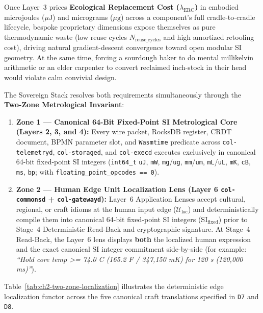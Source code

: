 Once Layer~3 prices \textbf{Ecological Replacement Cost ($\lambda_{\mathrm{ERC}}$)} in
embodied microjoules ($\mu\mathrm{J}$) and micrograms ($\mu\mathrm{g}$) across a component's
full cradle-to-cradle lifecycle, bespoke proprietary dimensions expose themselves as pure
thermodynamic waste (low reuse cycles $N_{\mathrm{reuse\_cycles}}$ and high amortized retooling
cost), driving natural gradient-descent convergence toward open modular SI geometry. At the
same time, forcing a sourdough baker to do mental millikelvin arithmetic or an elder
carpenter to convert reclaimed inch-stock in their head would violate calm convivial design.

The Sovereign Stack resolves both requirements simultaneously through the \textbf{Two-Zone
Metrological Invariant}:
\begin{enumerate}
\item \textbf{Zone 1 --- Canonical 64-Bit Fixed-Point SI Metrological Core (Layers 2, 3, and 4):}
        Every wire packet, RocksDB register, CRDT document, BPMN parameter slot, and
        \texttt{Wasmtime} predicate across \texttt{col-telemetryd}, \texttt{col-storaged}, and
        \texttt{col-execd} executes exclusively in canonical 64-bit fixed-point SI integers
        (\texttt{int64\_t} \texttt{uJ}, \texttt{mW}, \texttt{mg}/\texttt{ug},
        \texttt{mm}/\texttt{um}, \texttt{mL}/\texttt{uL}, \texttt{mK}, \texttt{cB},
        \texttt{ms}, \texttt{bp}; with \texttt{floating\_point\_opcodes == 0}).
\item \textbf{Zone 2 --- Human Edge Unit Localization Lens (Layer 6 \texttt{col-commonsd} + \texttt{col-gatewayd}):}
        Layer~6 Application Lenses accept cultural, regional, or craft idioms at the human input
        edge ($\mathcal{U}_{\mathrm{loc}}$) and deterministically compile them into canonical
        64-bit fixed-point SI integers ($\mathrm{SI}_{\mathrm{fixed}}$) prior to Stage~4
        Deterministic Read-Back and cryptographic signature. At Stage~4 Read-Back, the Layer~6
        lens displays \textbf{both} the localized human expression and the exact canonical SI
        integer commitment side-by-side (for example: \textit{``Hold core temp >= 74.0 C
        (165.2 F / 347,150 mK) for 120 s (120,000 ms)''}).
\end{enumerate}

Table~\ref{tab:ch2-two-zone-localization} illustrates the deterministic edge localization
functor across the five canonical craft translations specified in \texttt{D7} and \texttt{D8}.

